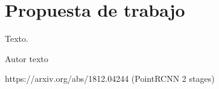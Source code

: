 \chapter{Propuesta de trabajo}
\label{cha:Propuesta de trabajo}

\begin{FraseCelebre}
  \begin{Frase}
    Texto.
  \end{Frase}
  \begin{Fuente}
    Autor texto
  \end{Fuente}
\end{FraseCelebre}

https://arxiv.org/abs/1812.04244 (PointRCNN 2 stages)